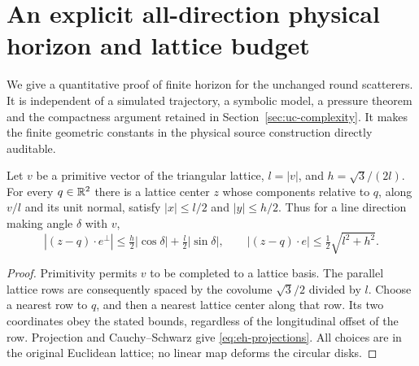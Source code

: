 \section{An explicit all-direction physical horizon and lattice budget}
\label{sec:eh-horizon}
We give a quantitative proof of finite horizon for the unchanged round
scatterers. It is independent of a simulated trajectory, a symbolic
model, a pressure theorem and the compactness argument retained in
Section~\ref{sec:uc-complexity}. It makes the finite geometric constants
in the physical source construction directly auditable.

\begin{lemma}
\label{lem:eh-rectangle}
Let $v$ be a primitive vector of the triangular lattice, $l=|v|$, and
$h=\sqrt3/(2l)$. For every $q\in\mathbb R^2$ there is a lattice center $z$
whose components relative to $q$, along $v/l$ and its unit normal,
satisfy $|x|\le l/2$ and $|y|\le h/2$. Thus for a line direction
making angle $\delta$ with $v$,
\begin{equation}\label{eq:eh-projections}
 |(z-q)\cdot e^\perp|
    \le \tfrac h2|\cos\delta|+\tfrac l2|\sin\delta|,
 \qquad |(z-q)\cdot e|\le\tfrac12\sqrt{l^2+h^2}.
\end{equation}
\end{lemma}
\begin{proof}
Primitivity permits $v$ to be completed to a lattice basis. The parallel
lattice rows are consequently spaced by the covolume $\sqrt3/2$ divided
by $l$. Choose a nearest row to $q$, and then a nearest lattice center
along that row. Its two coordinates obey the stated bounds, regardless
of the longitudinal offset of the row. Projection and Cauchy--Schwarz
give \eqref{eq:eh-projections}. All choices are in the original Euclidean
lattice; no linear map deforms the circular disks.
\end{proof}

